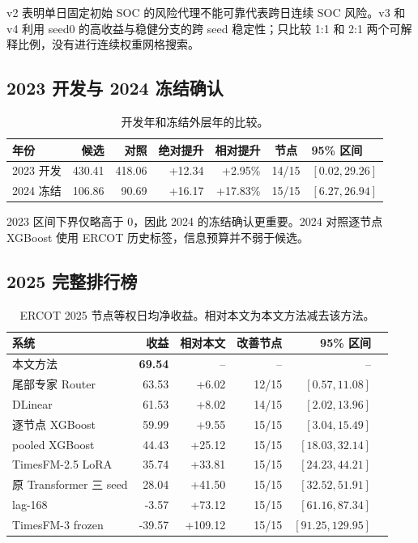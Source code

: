 \documentclass[UTF8,a4paper,11pt,fontset=fandol]{ctexart}
\newcommand{\best}[1]{\textbf{#1}}
\begin{document}
v2 表明单日固定初始 SOC 的风险代理不能可靠代表跨日连续 SOC 风险。v3 和 v4 利用 seed0 的高收益与稳健分支的跨 seed 稳定性；只比较 1:1 和 2:1 两个可解释比例，没有进行连续权重网格搜索。

\subsection{2023 开发与 2024 冻结确认}

\begin{table}[H]
\centering
\caption{开发年和冻结外层年的比较。}
\label{tab:2023-2024}
\footnotesize
\begin{tabular}{lrrrrcl}
\toprule
年份 & 候选 & 对照 & 绝对提升 & 相对提升 & 节点 & 95\% 区间 \\
\midrule
2023 开发 & 430.41 & 418.06 & +12.34 & +2.95\% & 14/15 & $[0.02,29.26]$ \\
2024 冻结 & 106.86 & 90.69 & +16.17 & +17.83\% & 15/15 & $[6.27,26.94]$ \\
\bottomrule
\end{tabular}
\end{table}

2023 区间下界仅略高于 0，因此 2024 的冻结确认更重要。2024 对照逐节点 XGBoost 使用 ERCOT 历史标签，信息预算并不弱于候选。

\subsection{2025 完整排行榜}

\begin{table}[H]
\centering
\caption{ERCOT 2025 节点等权日均净收益。相对本文为本文方法减去该方法。}
\label{tab:2025-ranking}
\footnotesize
\begin{tabular}{lrrrrl}
\toprule
系统 & 收益 & 相对本文 & 改善节点 & 95\% 区间 \\
\midrule
本文方法 & \best{69.54} & -- & -- & -- \\
尾部专家 Router & 63.53 & +6.02 & 12/15 & $[0.57,11.08]$ \\
DLinear & 61.53 & +8.02 & 14/15 & $[2.02,13.96]$ \\
逐节点 XGBoost & 59.99 & +9.55 & 15/15 & $[3.04,15.49]$ \\
pooled XGBoost & 44.43 & +25.12 & 15/15 & $[18.03,32.14]$ \\
TimesFM-2.5 LoRA & 35.74 & +33.81 & 15/15 & $[24.23,44.21]$ \\
原 Transformer 三 seed & 28.04 & +41.50 & 15/15 & $[32.52,51.91]$ \\
lag-168 & -3.57 & +73.12 & 15/15 & $[61.16,87.34]$ \\
TimesFM-3 frozen & -39.57 & +109.12 & 15/15 & $[91.25,129.95]$ \\
\bottomrule
\end{tabular}
\end{table}
\end{document}
